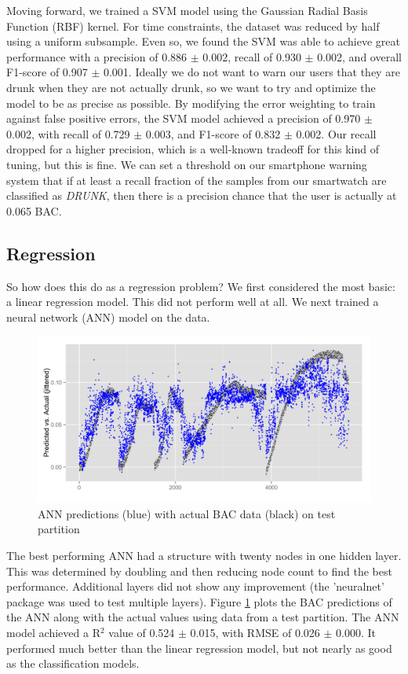 Moving forward, we trained a SVM model using the Gaussian Radial Basis Function (RBF) kernel. For time constraints, the dataset was reduced by half using a uniform subsample. Even so, we found the SVM was able to achieve great performance with a precision of 0.886 $\pm$ 0.002, recall of 0.930 $\pm$ 0.002, and overall F1-score of 0.907 $\pm$ 0.001. Ideally we do not want to warn our users that they are drunk when they are not actually drunk, so we want to try and optimize the model to be as precise as possible. By modifying the error weighting to train against false positive errors, the SVM model achieved a precision of 0.970 $\pm$ 0.002, with recall of 0.729 $\pm$ 0.003, and F1-score of 0.832 $\pm$ 0.002. Our recall dropped for a higher precision, which is a well-known tradeoff for this kind of tuning, but this is fine. We can set a threshold on our smartphone warning system that if at least a recall fraction of the samples from our smartwatch are classified as \textit{DRUNK}, then there is a precision chance that the user is actually at 0.065 BAC.

\subsection{Regression}

So how does this do as a regression problem? We first considered the most basic: a linear regression model. This did not perform well at all. We next trained a neural network (ANN) model on the data. \begin{figure}
	\includegraphics[width=1.0\textwidth]{../figs/nn_all}
	\caption{ANN predictions (blue) with actual BAC data (black) on test partition}
	\label{fig:nn_all}
\end{figure}The best performing ANN had a structure with twenty nodes in one hidden layer. This was determined by doubling and then reducing node count to find the best performance. Additional layers did not show any improvement (the 'neuralnet' package was used to test multiple layers). Figure \ref{fig:nn_all} plots the BAC predictions of the ANN along with the actual values using data from a test partition. The ANN model achieved a R$^2$ value of 0.524 $\pm$ 0.015, with RMSE of 0.026 $\pm$ 0.000. It performed much better than the linear regression model, but not nearly as good as the classification models.